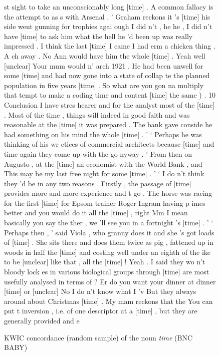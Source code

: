 \begin{figure}[!htbp]
\caption{KWIC concordance (random sample) of the noun \textit{time} (BNC BABY)}
\label{fig:sampleconcordance}
\hrulefill
\begin{fitverb}
st sight to take an unconscionably long [time] . A common fallacy is the attempt to as
s with Arsenal . ' Graham reckons it 's [time] his side went gunning for trophies agai
ough I did n't , he he , I did n't have [time] to ask him what the hell he 'd been up 
was really impressed . I think the last [time] I came I had erm a chicken thing . A ch
 away . No Ann would have him the whole [time] . Yeah well [unclear] Your mum would n'
arch 1921 . He had been unwell for some [time] and had now gone into a state of collap
te the planned population in five years [time] . So what are you gon na multiply that 
tempt to make a coding time and content [time] the same ) . 10 Conclusion I have stres
 hearer and for the analyst most of the [time] . Most of the time , things will indeed
in good faith and was reasonable at the [time] it was prepared . The bank gave conside
 he had something on his mind the whole [time] . ' ` Perhaps he was thinking of his wr
ctices of commercial architects because [time] and time again they come up with the go
nyway . ' From then on Augusto , at the [time] an economist with the World Bank , and 
This may be my last free night for some [time] . ' ` I do n't think they 'd be in any 
 two reasons . Firstly , the passage of [time] provides more and more experience and t
go . The horse was racing for the first [time] for Epsom trainer Roger Ingram having p
imes better and you would do it all the [time] , right Mm I mean basically you say the
ther , we 'll see you in a fortnight 's [time] . ' ` Perhaps then , ' said Viola , who
 granny does it and she 's got loads of [time] . She sits there and does them twice as
 pig , fattened up in woods in half the [time] and costing well under an eighth of the
ike to be [unclear] like that , all the [time] ! Yeah . I said they wo n't bloody lock
es in various biological groups through [time] are most usefully analysed in terms of 
 ? Er do you want your dinner at dinner [time] or [unclear] No I do n't know what I 'v
 But they always around about Christmas [time] . My mam reckons that the You can put t
inversion , i.e. of one descriptor at a [time] , but they are generally provided and e
\end{fitverb}
\hrulefill
\end{figure}

